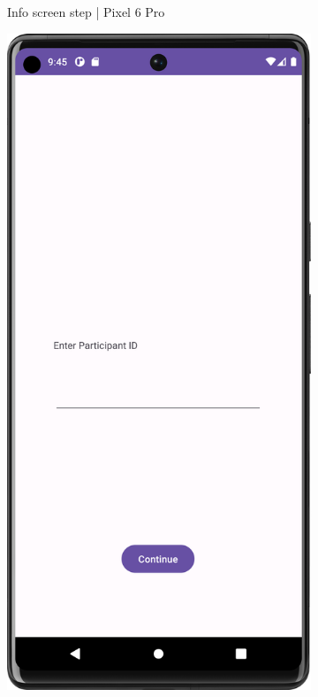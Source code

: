 \begin{figure}[htbp]
\begin{subfigure}[b]{0.25\textwidth}
        \caption{Info screen step | Pixel 6 Pro}
        \label{subfig:InfoScreenPixel}
    \end{subfigure}
        \hspace{1cm}
    \begin{subfigure}[b]{0.25\textwidth}
        \centering
        \includegraphics[width=\textwidth]{content/07_evaluation_of_the_solution/Screenshot_T10b.png}

\end{subfigure}
\end{figure}
